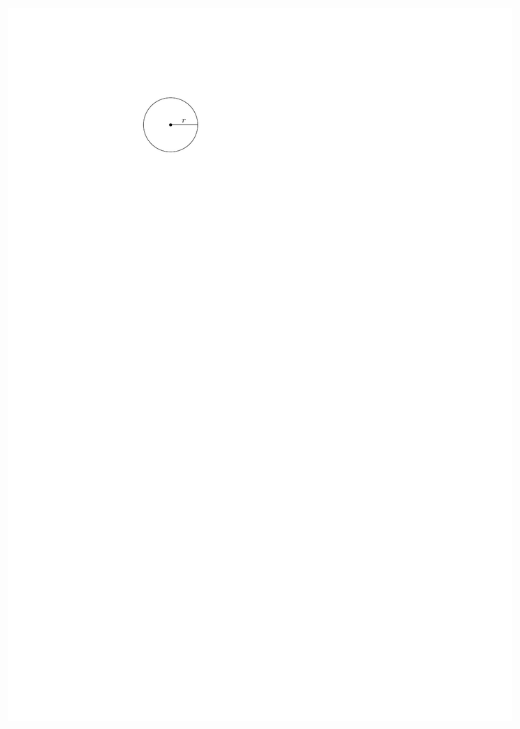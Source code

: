 \documentclass[12pt]{amsart}
\begin{document}
\begin{enumerate}
\includegraphics[scale = 0.8]{circle}
\end{enumerate} 
\end{document}
